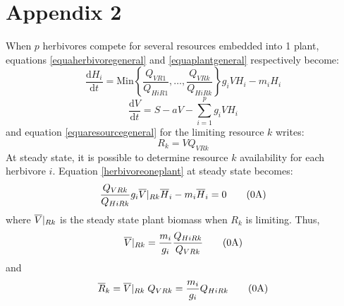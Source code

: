 \documentclass[12pt]{article}
\newcommand\equa[1]{\frac{\mathrm{d}#1}{\mathrm{d}t}}
\newcommand\barre[1]{\overline{\rule{0pt}{1.5ex}#1}}
\begin{document}
\section*{Appendix 2}
When $p$ herbivores compete for several resources embedded into 1 plant, equations \ref{equaherbivoregeneral} and \ref{equaplantgeneral} respectively become:
\begin{equation}\label{herbivoreoneplant}
\equa{H_i}= \text{Min} \left \lbrace \frac{Q_{VR1}}{Q_{HiR1}}, \ldots, \frac{Q_{VRk}}{Q_{HiRk}}  \right \rbrace g_iV H_i -m_i H_i \tag{\theequation A}
\end{equation}
\begin{equation}
\equa{V}=S-aV-\sum ^p _{i=1} g_iVH_i \tag{\theequation A}
\end{equation}
and equation \ref{equaresourcegeneral} for the limiting resource $k$ writes:
\begin{equation}
R_k=VQ_{VRk} \tag{\theequation A}
\end{equation}
At steady state, it is possible to determine resource $k$ availability for each herbivore $i$. %
Equation \ref{herbivoreoneplant} at steady state becomes:
\begin{equation}
\frac{Q_{VRk}}{Q_{HiRk}} g_i \barre{V}|_{Rk} \barre{H}_i -m_i \barre{H}_i = 0 \tag{\theequation A}
\end{equation}
where $\barre{V}|_{Rk}$ is the steady state plant biomass when $R_k$ is limiting. Thus,
\begin{equation}
\barre{V}|_{Rk}=\frac{m_i}{g_i}\frac{Q_{HiRk}}{Q_{VRk}} \tag{\theequation A}
\end{equation}
and 
\begin{equation}
\barre{R}_k=\barre{V}|_{Rk}\; Q_{VRk} =\frac{m_i}{g_i}Q_{HiRk} \tag{\theequation A}
\end{equation}
\end{document}
